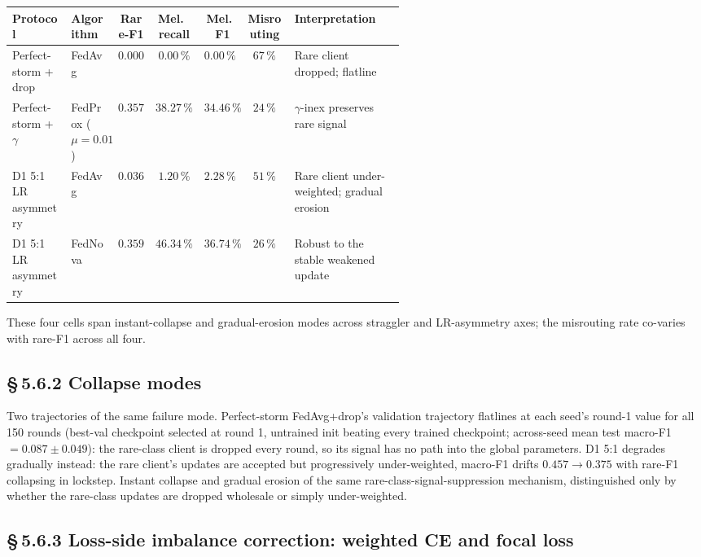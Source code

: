 \begin{center}
\small
\begin{tabular}{p{0.15\linewidth} p{0.12\linewidth} c c c c p{0.29\linewidth}}
\hline
Protocol                  & Algorithm & Rare-F1 & Mel.\ recall & Mel.\ F1 & Misrouting & Interpretation \\
\hline
Perfect-storm + drop      & FedAvg    & $0.000$ & $0.00\,\%$  & $0.00\,\%$  & $67\,\%$   & Rare client dropped; flatline \\
Perfect-storm + $\gamma$  & FedProx ($\mu=0.01$) & $0.357$ & $38.27\,\%$ & $34.46\,\%$ & $24\,\%$ & $\gamma$-inex preserves rare signal \\
D1 5:1 LR asymmetry       & FedAvg    & $0.036$ & $1.20\,\%$  & $2.28\,\%$  & $51\,\%$   & Rare client under-weighted; gradual erosion \\
D1 5:1 LR asymmetry       & FedNova   & $0.359$ & $46.34\,\%$ & $36.74\,\%$ & $26\,\%$   & Robust to the stable weakened update \\
\hline
\end{tabular}
\end{center}

\noindent
These four cells span instant-collapse and gradual-erosion modes across
straggler and LR-asymmetry axes; the misrouting rate co-varies with rare-F1
across all four.


\subsection*{\S\,5.6.2 Collapse modes}

Two trajectories of the same failure mode. Perfect-storm FedAvg+drop's
validation trajectory flatlines at each seed's round-1 value for all 150
rounds (best-val checkpoint selected at round 1, untrained init beating
every trained checkpoint; across-seed mean test macro-F1 $= 0.087 \pm 0.049$):
the rare-class client is dropped every round, so its signal has no path
into the global parameters. D1 5:1 degrades gradually instead: the rare client's updates
are accepted but progressively under-weighted, macro-F1 drifts $0.457 \to
0.375$ with rare-F1 collapsing in lockstep. Instant collapse and gradual
erosion of the same rare-class-signal-suppression mechanism, distinguished
only by whether the rare-class updates are dropped wholesale or simply
under-weighted.


\subsection*{\S\,5.6.3 Loss-side imbalance correction: weighted CE and
focal loss}

